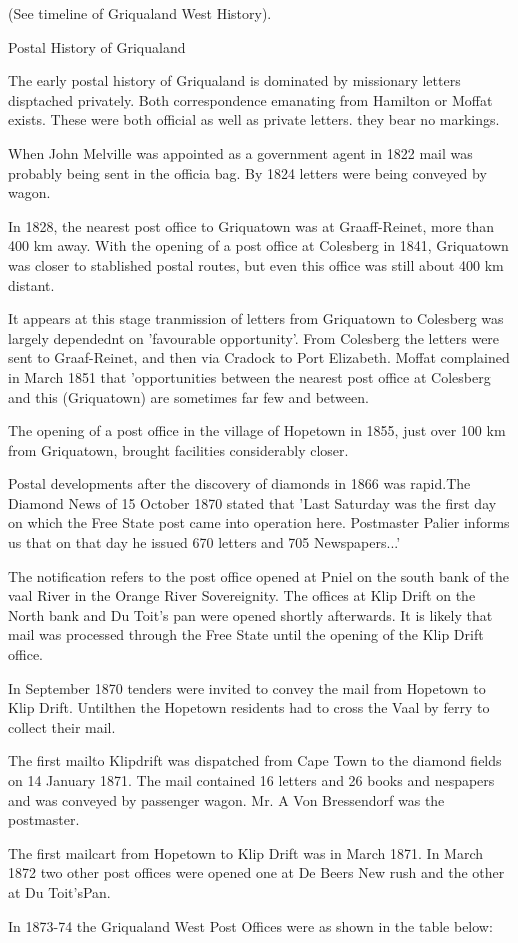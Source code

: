(See timeline of Griqualand West History).

Postal History of Griqualand

The early postal history of Griqualand is dominated by missionary letters disptached privately. Both correspondence emanating from Hamilton or Moffat exists. These were both official as well as private letters. they bear no markings.

When John Melville was appointed as a government agent in 1822 mail was probably being sent in the officia bag. By 1824 letters were being conveyed by wagon.

In 1828, the nearest post office to Griquatown was at Graaff-Reinet, more than 400 km away. With the opening of a post office at Colesberg in 1841, Griquatown was closer to stablished postal routes, but even this office was still about 400 km distant.

It appears at this stage tranmission of letters from Griquatown to Colesberg was largely dependednt on 'favourable opportunity'. From Colesberg the letters were sent to Graaf-Reinet, and then via Cradock to Port Elizabeth. Moffat complained in March 1851 that 'opportunities between the nearest post office at Colesberg and this (Griquatown) are sometimes far few and between.

The opening of a post office in the village of Hopetown in 1855, just over 100 km from Griquatown, brought facilities considerably closer.

Postal developments after the discovery of diamonds in 1866 was rapid.The Diamond News of 15 October 1870 stated that 'Last Saturday was the first day on which the Free State post came into operation here. Postmaster Palier informs us that on that day he issued 670 letters and 705 Newspapers...'

The notification refers to the post office opened at Pniel on the south bank of the vaal River in the Orange River Sovereignity. The offices at Klip Drift on the North bank and Du Toit's pan were opened shortly afterwards. It is likely that mail was processed through the Free State until the opening of the Klip Drift office.

In September 1870 tenders were invited to convey the mail from Hopetown to Klip Drift. Untilthen the Hopetown residents had to cross the Vaal by ferry to collect their mail.

The first mailto Klipdrift was dispatched from Cape Town to the diamond fields on 14 January 1871. The mail contained 16 letters and 26 books and nespapers and was conveyed by passenger wagon. Mr. A Von Bressendorf was the postmaster.

The first mailcart from Hopetown to Klip Drift was in March 1871. In March 1872 two other post offices were opened one at De Beers New rush and the other at Du Toit'sPan.

In 1873-74 the Griqualand West Post Offices were as shown in the table below:                